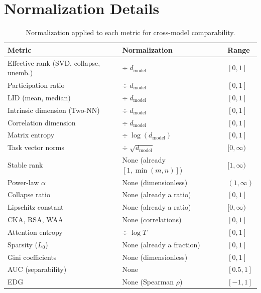 \documentclass[preprint]{neurips_2025}
\begin{document}
\section{Normalization Details}
\label{app:normalization}

\begin{table}[h]
\centering
\caption{Normalization applied to each metric for cross-model comparability.}
\label{tab:normalization}
\small
\begin{tabular}{@{}lll@{}}
\toprule
\textbf{Metric} & \textbf{Normalization} & \textbf{Range} \\
\midrule
Effective rank (SVD, collapse, unemb.) & $\div\; d_{\text{model}}$ & $[0, 1]$ \\
Participation ratio & $\div\; d_{\text{model}}$ & $[0, 1]$ \\
LID (mean, median) & $\div\; d_{\text{model}}$ & $[0, 1]$ \\
Intrinsic dimension (Two-NN) & $\div\; d_{\text{model}}$ & $[0, 1]$ \\
Correlation dimension & $\div\; d_{\text{model}}$ & $[0, 1]$ \\
Matrix entropy & $\div\; \log(d_{\text{model}})$ & $[0, 1]$ \\
Task vector norms & $\div\; \sqrt{d_{\text{model}}}$ & $[0, \infty)$ \\
\midrule
Stable rank & None (already $[1, \min(m,n)]$) & $[1, \infty)$ \\
Power-law $\alpha$ & None (dimensionless) & $(1, \infty)$ \\
Collapse ratio & None (already a ratio) & $[0, 1]$ \\
Lipschitz constant & None (already a ratio) & $[0, \infty)$ \\
CKA, RSA, WAA & None (correlations) & $[0, 1]$ \\
Attention entropy & $\div\; \log T$ & $[0, 1]$ \\
Sparsity ($L_0$) & None (already a fraction) & $[0, 1]$ \\
Gini coefficients & None (dimensionless) & $[0, 1]$ \\
AUC (separability) & None & $[0.5, 1]$ \\
EDG & None (Spearman $\rho$) & $[-1, 1]$ \\
\bottomrule
\end{tabular}
\end{table}
\end{document}
